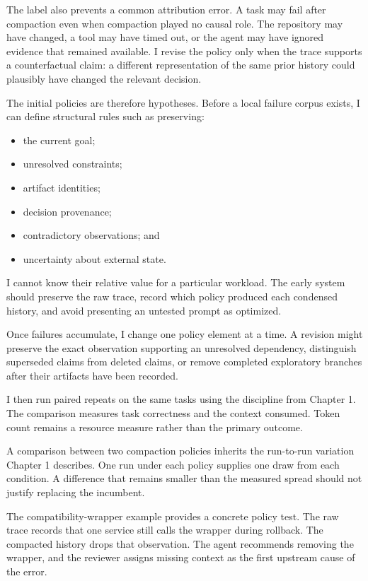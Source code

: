 The label also prevents a common attribution error. A task may fail after compaction even when compaction played no causal role. The repository may have changed, a tool may have timed out, or the agent may have ignored evidence that remained available. I revise the policy only when the trace supports a counterfactual claim: a different representation of the same prior history could plausibly have changed the relevant decision.

The initial policies are therefore hypotheses. Before a local failure corpus exists, I can define structural rules such as preserving:

\begin{itemize}
\tightlist
\item
  the current goal;
\item
  unresolved constraints;
\item
  artifact identities;
\item
  decision provenance;
\item
  contradictory observations; and
\item
  uncertainty about external state.
\end{itemize}

I cannot know their relative value for a particular workload. The early system should preserve the raw trace, record which policy produced each condensed history, and avoid presenting an untested prompt as optimized.

Once failures accumulate, I change one policy element at a time. A revision might preserve the exact observation supporting an unresolved dependency, distinguish superseded claims from deleted claims, or remove completed exploratory branches after their artifacts have been recorded.

I then run paired repeats on the same tasks using the discipline from Chapter 1. The comparison measures task correctness and the context consumed. Token count remains a resource measure rather than the primary outcome.

A comparison between two compaction policies inherits the run-to-run variation Chapter 1 describes. One run under each policy supplies one draw from each condition. A difference that remains smaller than the measured spread should not justify replacing the incumbent.

The compatibility-wrapper example provides a concrete policy test. The raw trace records that one service still calls the wrapper during rollback. The compacted history drops that observation. The agent recommends removing the wrapper, and the reviewer assigns missing context as the first upstream cause of the error.

